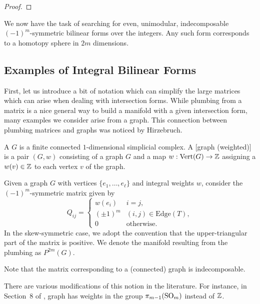 \begin{theorem}
\end{theorem}
\begin{proof}
\end{proof}

We now have the task of searching for even, unimodular, indecomposable $(-1)^m$-symmetric bilinear forms over the integers. Any such form corresponds to a homotopy sphere in $2m$ dimensions. 

\subsection{Examples of Integral Bilinear Forms}
First, let us introduce a bit of notation which can simplify the large matrices which can arise when dealing with intersection forms. While plumbing from a matrix is a nice general way to build a manifold with a given intersection form, many examples we consider arise from a graph. This connection between plumbing matrices and graphs was noticed by Hirzebruch.

\begin{definition}
	A  $G$ is a finite connected $1$-dimensional simplicial complex.
	A [graph (weighted)] is a pair $(G,w)$ consisting of a graph $G$ and a map $w : \operatorname{Vert}(G) \to \mathbb{Z}$ assigning a  $w(v)\in \mathbb{Z}$ to each vertex $v$ of the graph.
\end{definition}

Given a graph $G$ with vertices $\{e_1,\ldots, e_\ell\}$ and integral weights $w$, consider the $(-1)^m$-symmetric matrix given by
\[
	Q_{ij} = \begin{cases}
		w(e_i)    & i=j,                       \\
		(\pm 1)^m & (i,j)\in \textrm{Edge}(T), \\
		0         & \textrm{otherwise}.
	\end{cases}
\]
In the skew-symmetric case, we adopt the convention that the upper-triangular part of the matrix is positive. We denote the manifold resulting from the plumbing as $P^{2m}(G)$.

\begin{remark}
	Note that the matrix corresponding to a (connected) graph is indecomposable.
\end{remark}

\begin{remark}
	There are various modifications of this notion in the literature. For instance, in Section~8 of \cite{hirzebruch1971quadratic}, graph has weights in the group $\pi_{m-1}(\mathrm{SO}_m)$ instead of $\mathbb{Z}$.
\end{remark}

